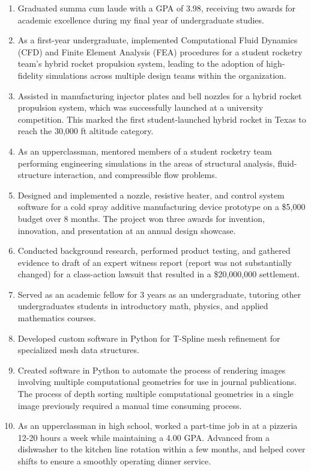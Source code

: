 \documentclass[letterpaper,11pt]{article}
\begin{document}
  \begin{enumerate} %
    
    \item Graduated summa cum laude with a GPA of 3.98, receiving two awards for academic excellence during my final year of undergraduate studies.
    
    \item As a first-year undergraduate, implemented Computational Fluid Dynamics (CFD) and Finite Element Analysis (FEA) procedures for a student rocketry team’s hybrid rocket propulsion system, leading to the adoption of high-fidelity simulations across multiple design teams within the organization.
    
    \item Assisted in manufacturing injector plates and bell nozzles for a hybrid rocket propulsion system, which was successfully launched at a university competition. This marked the first student-launched hybrid rocket in Texas to reach the 30,000 ft altitude category.

    \item As an upperclassman, mentored members of a student rocketry team performing engineering simulations in the areas of structural analysis, fluid-structure interaction, and compressible flow problems.

    \item Designed and implemented a nozzle, resistive heater, and control system software for a cold spray additive manufacturing device prototype on a \$5,000 budget over 8 months. The project won three awards for invention, innovation, and presentation at an annual design showcase.

    \item Conducted background research, performed product testing, and gathered evidence to draft of an expert witness report (report was not substantially changed) for a class-action lawsuit that resulted in a \$20,000,000 settlement.

    \item Served as an academic fellow for 3 years as an undergraduate, tutoring other undergraduates students in introductory math, physics, and applied mathematics courses.  

    \item Developed custom software in Python for T-Spline mesh refinement for specialized mesh data structures. 

    \item Created software in Python to automate the process of rendering images involving multiple computational geometries for use in journal publications. The process of depth sorting multiple computational geometries in a single image previously required a manual time consuming process. 

    \item As an upperclassman in high school, worked a part-time job in at a pizzeria 12-20 hours a week while maintaining a 4.00 GPA. Advanced from a dishwasher to the kitchen line rotation within a few months, and helped cover shifts to ensure a smoothly operating dinner service.   

  \end{enumerate}
\end{document}
